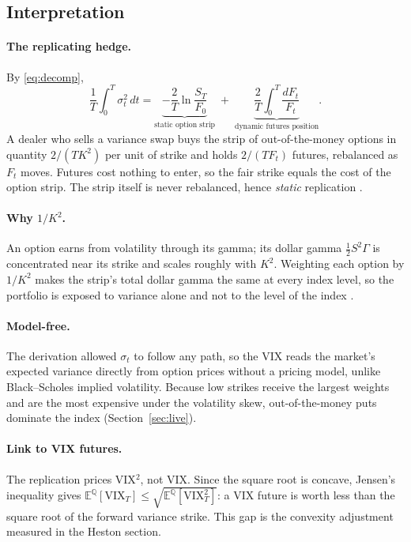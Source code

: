 \documentclass[12pt]{article}
\newcommand{\E}{\mathbb{E}^{\mathbb{Q}}}
\newcommand{\VIX}{\mathrm{VIX}}
\begin{document}
\subsection{Interpretation}

\paragraph{The replicating hedge.} By \eqref{eq:decomp},
\begin{equation}
  \frac{1}{T}\int_0^T\sigma_t^2\,dt
  = \underbrace{-\frac{2}{T}\ln\frac{S_T}{F_0}}_{\text{static option strip}}
  \;+\; \underbrace{\frac{2}{T}\int_0^T\frac{dF_t}{F_t}}_{\text{dynamic futures position}} .
\end{equation}
A dealer who sells a variance swap buys the strip of out-of-the-money options in quantity $2/(TK^2)$ per unit of strike and holds $2/(TF_t)$ futures, rebalanced as $F_t$ moves. Futures cost nothing to enter, so the fair strike equals the cost of the option strip. The strip itself is never rebalanced, hence \emph{static} replication \cite{ddkz}.

\paragraph{Why $1/K^2$.} An option earns from volatility through its gamma; its dollar gamma $\tfrac{1}{2}S^2\Gamma$ is concentrated near its strike and scales roughly with $K^2$. Weighting each option by $1/K^2$ makes the strip's total dollar gamma the same at every index level, so the portfolio is exposed to variance alone and not to the level of the index \cite{ddkz}.

\paragraph{Model-free.} The derivation allowed $\sigma_t$ to follow any path, so the VIX reads the market's expected variance directly from option prices without a pricing model, unlike Black--Scholes implied volatility. Because low strikes receive the largest weights and are the most expensive under the volatility skew, out-of-the-money puts dominate the index (Section~\ref{sec:live}).

\paragraph{Link to VIX futures.} The replication prices VIX$^2$, not VIX. Since the square root is concave, Jensen's inequality gives $\E[\VIX_T]\le\sqrt{\E[\VIX_T^2]}$: a VIX future is worth less than the square root of the forward variance strike. This gap is the convexity adjustment measured in the Heston section.
\end{document}
